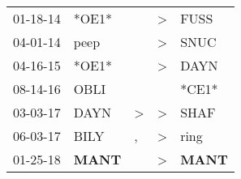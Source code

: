 \begin{supertabular}{p{0.07\textwidth}p{0.06\textwidth}p{0.02\textwidth}p{0.02\textwidth}p{0.06\textwidth}}
          01-18-14\textsuperscript{} &                            *OE1* &                  &     \textgreater &           FUSS\textsuperscript{} \\
          04-01-14\textsuperscript{} &           peep\textsuperscript{} &                  &     \textgreater &           SNUC\textsuperscript{} \\
          04-16-15\textsuperscript{} &                            *OE1* &                  &     \textgreater &           DAYN\textsuperscript{} \\
          08-14-16\textsuperscript{} &           OBLI\textsuperscript{} &                  &                  &                            *CE1* \\
          03-03-17\textsuperscript{} &           DAYN\textsuperscript{} &     \textgreater &     \textgreater &           SHAF\textsuperscript{} \\
          06-03-17\textsuperscript{} &           BILY\textsuperscript{} &                , &     \textgreater &           ring\textsuperscript{} \\
          01-25-18\textsuperscript{} &  \textbf{MANT\textsuperscript{}} &                  &     \textgreater &  \textbf{MANT\textsuperscript{}} \\
\end{supertabular}
